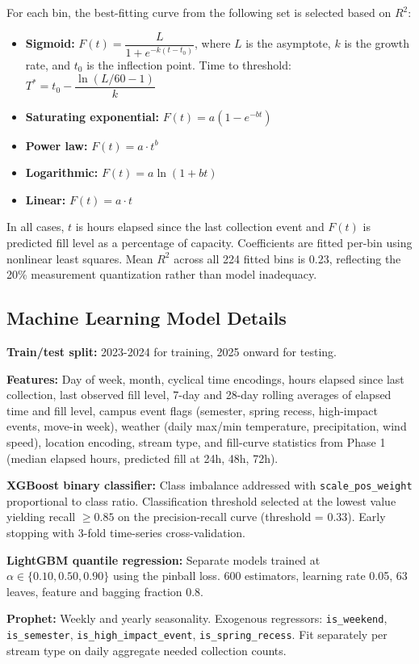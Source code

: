 \documentclass[11pt]{article}
\begin{document}
For each bin, the best-fitting curve from the following set is selected based on $R^2$:

\begin{itemize}
  \item \textbf{Sigmoid:} $F(t) = \dfrac{L}{1 + e^{-k(t - t_0)}}$,
  where $L$ is the asymptote, $k$ is the growth rate, and $t_0$ is the inflection point.
  Time to threshold: $T^* = t_0 - \dfrac{\ln(L/60 - 1)}{k}$

  \item \textbf{Saturating exponential:} $F(t) = a(1 - e^{-bt})$

  \item \textbf{Power law:} $F(t) = a \cdot t^b$

  \item \textbf{Logarithmic:} $F(t) = a \ln(1 + bt)$

  \item \textbf{Linear:} $F(t) = a \cdot t$
\end{itemize}

In all cases, $t$ is hours elapsed since the last collection event and $F(t)$ is predicted
fill level as a percentage of capacity. Coefficients are fitted per-bin using nonlinear
least squares. Mean $R^2$ across all 224 fitted bins is 0.23, reflecting the 20\%
measurement quantization rather than model inadequacy.

\subsection*{Machine Learning Model Details}

\textbf{Train/test split:} 2023-2024 for training, 2025 onward for testing.

\textbf{Features:} Day of week, month, cyclical time encodings, hours elapsed since last
collection, last observed fill level, 7-day and 28-day rolling averages of elapsed time
and fill level, campus event flags (semester, spring recess, high-impact events, move-in
week), weather (daily max/min temperature, precipitation, wind speed), location encoding,
stream type, and fill-curve statistics from Phase 1 (median elapsed hours, predicted fill
at 24h, 48h, 72h).

\textbf{XGBoost binary classifier:} Class imbalance addressed with
\texttt{scale\_pos\_weight} proportional to class ratio. Classification threshold selected
at the lowest value yielding recall $\geq 0.85$ on the precision-recall curve (threshold
= 0.33). Early stopping with 3-fold time-series cross-validation.

\textbf{LightGBM quantile regression:} Separate models trained at $\alpha \in
\{0.10, 0.50, 0.90\}$ using the pinball loss. 600 estimators, learning rate 0.05,
63 leaves, feature and bagging fraction 0.8.

\textbf{Prophet:} Weekly and yearly seasonality. Exogenous regressors:
\texttt{is\_weekend}, \texttt{is\_semester}, \texttt{is\_high\_impact\_event},
\texttt{is\_spring\_recess}. Fit separately per stream type on daily aggregate needed
collection counts.
\end{document}

